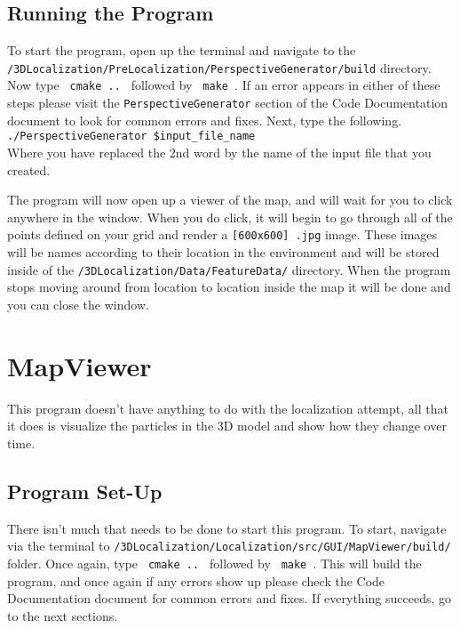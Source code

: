 \documentclass[a4paper,11pt]{article}
\begin{document}
 \subsection{Running the Program}
  To start the program, open up the terminal and navigate to the \texttt{/3DLocalization/PreLocalization/PerspectiveGenerator/build} directory. Now type \texttt{  cmake ..  } followed by \texttt{  make  }. If an error appears in either of these steps please visit the \texttt{PerspectiveGenerator} section of the Code Documentation document to look for common errors and fixes. Next, type the following. \\
  \texttt{./PerspectiveGenerator }\verb.$input_file_name. \\
  Where you have replaced the 2nd word by the name of the input file that you created.

  The program will now open up a viewer of the map, and will wait for you to click anywhere in the window. When you do click, it will begin to go through all of the points defined on your grid and render a \texttt{[600x600] .jpg} image. These images will be names according to their location in the environment and will be stored inside of the \texttt{/3DLocalization/Data/FeatureData/} directory. When the program stops moving around from location to location inside the map it will be done and you can close the window.

  \section{MapViewer}
  This program doesn't have anything to do with the localization attempt, all that it does is visualize the particles in the 3D model and show how they change over time.

  \subsection{Program Set-Up}
  There isn't much that needs to be done to start this program. To start, navigate via the terminal to \texttt{/3DLocalization/Localization/src/GUI/MapViewer/build/} folder. Once again, type \texttt{  cmake ..  } followed by \texttt{ make }. This will build the program, and once again if any errors show up please check the Code Documentation document for common errors and fixes. If everything succeeds, go to the next sections.
\end{document}
